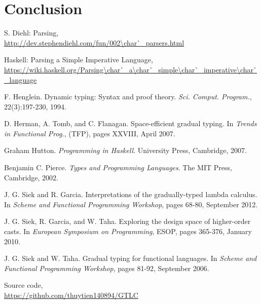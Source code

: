 \documentclass[11pt]{article}
\begin{document}
\section{Conclusion} 

\appendix


\begin{thebibliography}{9}
    S. Diehl:  Parsing, \\
    \url{http://dev.stephendiehl.com/fun/002\char`_parsers.html}

    Haskell: Parsing a Simple Imperative Language, \\
    \url{https://wiki.haskell.org/Parsing\char`_a\char`_simple\char`_imperative\char`_language}

    F. Henglein.
    Dynamic typing: Syntax and proof theory. 
    \textit{Sci. Comput. Program.},
    22(3):197-230, 1994.

    D. Herman, A. Tomb, and C. Flanagan. 
    Space-efficient gradual typing. 
    In \textit{Trends in Functional Prog.}, (TFP),
    pages XXVIII, April 2007.

    Graham Hutton. 
    \textit{Programming in Haskell}. 
    University Press, Cambridge, 2007.

    Benjamin C. Pierce. 
    \textit{Types and Programming Languages}. 
    The MIT Press, Cambridge, 2002.

    J. G. Siek and R. Garcia. 
    Interpretations of the gradually-typed lambda calculus. 
    In \textit{Scheme and Functional Programming Workshop}, 
    pages 68-80, September 2012.

    J. G. Siek, R. Garcia, and W. Taha. 
    Exploring the design space of higher-order casts. 
    In \textit{European Symposium on Programming}, ESOP,
    pages 365-376, January 2010.

    J. G. Siek and W. Taha. 
    Gradual typing for functional languages. 
    In \textit{Scheme and Functional Programming Workshop}, pages 81-92, September 2006.

    Source code, \\
    \url{https://github.com/thuytien140894/GTLC}
\end{thebibliography}
\end{document}
